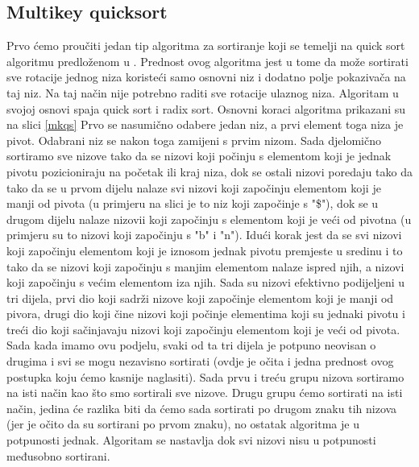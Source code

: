 \subsection{Multikey quicksort}
Prvo ćemo proučiti jedan tip algoritma za sortiranje koji se temelji na quick sort algoritmu predloženom u \cite{mkqs}. Prednost ovog algoritma jest u tome da može sortirati sve rotacije jednog niza koristeći samo osnovni niz i dodatno polje pokazivača na taj niz. Na taj način nije potrebno raditi sve rotacije ulaznog niza. Algoritam u svojoj osnovi spaja quick sort i radix sort. Osnovni koraci algoritma prikazani su na slici \ref{mkqs}  Prvo se nasumično odabere jedan niz, a prvi element toga niza je pivot. Odabrani niz se nakon toga zamijeni s prvim nizom. Sada djelomično sortiramo sve nizove tako da se nizovi koji počinju s elementom koji je jednak pivotu pozicioniraju na početak ili kraj niza, dok se ostali nizovi poredaju tako da tako da se u prvom dijelu nalaze svi nizovi koji započinju elementom koji je manji od pivota (u primjeru na slici je to niz koji započinje s "\$"), dok se u drugom dijelu nalaze nizovii koji započinju s elementom koji je veći od pivotna (u primjeru su to nizovi koji započinju s "b" i "n"). Idući korak jest da se svi nizovi koji započinju elementom koji je iznosom jednak pivotu premjeste u sredinu i to tako da se nizovi koji započinju s manjim elementom nalaze ispred njih, a nizovi koji započinju s većim elementom iza njih.  Sada su nizovi efektivno podijeljeni u tri dijela, prvi dio koji sadrži nizove koji započinje elementom koji je manji od pivora, drugi dio koji čine nizovi koji počinje elementima koji su jednaki pivotu i treći dio koji sačinjavaju nizovi  koji započinju elementom koji je veći od pivota. Sada kada imamo ovu podjelu, svaki od ta tri dijela je potpuno neovisan o drugima i svi se mogu nezavisno sortirati (ovdje je očita i jedna prednost ovog postupka koju ćemo kasnije naglasiti). Sada prvu i treću grupu nizova sortiramo na isti način kao što smo sortirali sve nizove. Drugu grupu ćemo sortirati na isti način, jedina će razlika biti da ćemo sada sortirati po drugom znaku tih nizova (jer je očito da su sortirani po prvom znaku), no ostatak algoritma je u potpunosti jednak. Algoritam se nastavlja dok svi nizovi nisu u potpunosti međusobno sortirani.


